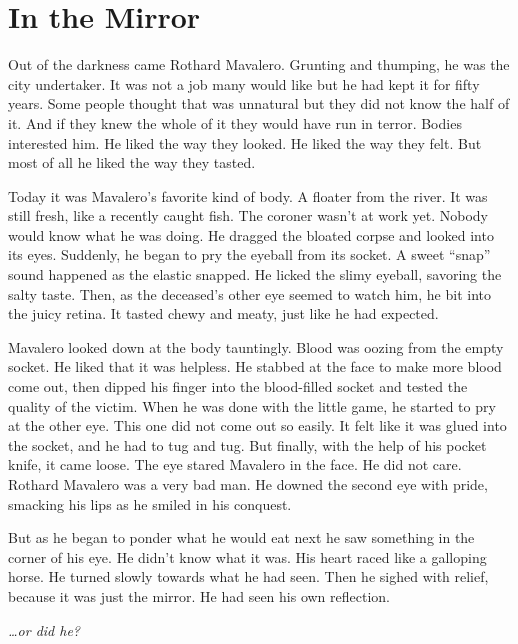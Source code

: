 \chapter{In the Mirror}


Out of the darkness came Rothard Mavalero. Grunting and thumping,
he was the city undertaker. It was not a job many would like but he
had kept it for fifty years. Some people thought that was unnatural
but they did not know the half of it. And if they knew the whole of
it they would have run in terror. Bodies interested him. He liked
the way they looked. He liked the way they felt. But most of all he
liked the way they tasted.



Today it was Mavalero's favorite kind of body. A floater from the
river. It was still fresh, like a recently caught fish. The coroner
wasn't at work yet. Nobody would know what he was doing. He dragged
the bloated corpse and looked into its eyes. Suddenly, he began to
pry the eyeball from its socket. A sweet ``snap'' sound happened as
the elastic snapped. He licked the slimy eyeball, savoring the
salty taste. Then, as the deceased's other eye seemed to watch him,
he bit into the juicy retina. It tasted chewy and meaty, just like
he had expected.



Mavalero looked down at the body tauntingly. Blood was oozing from
the empty socket. He liked that it was helpless. He stabbed at the
face to make more blood come out, then dipped his finger into the
blood-filled socket and tested the quality of the victim. When he
was done with the little game, he started to pry at the other eye.
This one did not come out so easily. It felt like it was glued into
the socket, and he had to tug and tug. But finally, with the help
of his pocket knife, it came loose. The eye stared Mavalero in the
face. He did not care. Rothard Mavalero was a very bad man. He
downed the second eye with pride, smacking his lips as he smiled in
his conquest.



But as he began to ponder what he would eat next he saw something
in the corner of his eye. He didn't know what it was. His heart
raced like a galloping horse. He turned slowly towards what he had
seen. Then he sighed with relief, because it was just the mirror.
He had seen his own reflection.



{\em {\ldots}or did he?}



